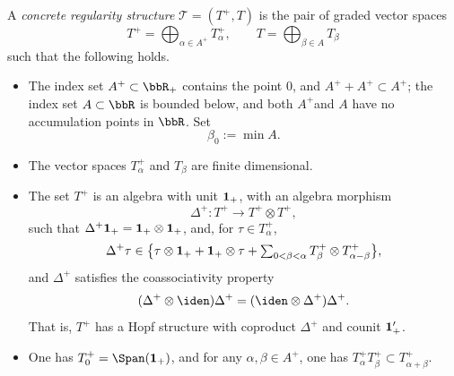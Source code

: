 \begin{defn*}
A \emph{{concrete regularity structure}} $\mathscr{T}=(T^+,T)$ is the pair of graded vector spaces\vspace*{-3pt}
\[
T^+ = \bigoplus_{\alpha\in A^+} T_\alpha^+, \qquad T = \bigoplus_{\beta\in A} T_\beta
\]
such that the following holds.
\begin{itemize}
\item The index set $A^{+}\subset \bbR_+$ contains the point $0$, and $A^++A^+ \subset A^+$; the index set $A\subset\bbR$ is bounded below, and both $A^+$and $A$ have no accumulation points in $\bbR$. Set\vspace*{-3pt}
\[
\beta_0 := \min A.
\]

\item The vector spaces $T_\alpha^+$ and $T_\beta$ are finite dimensional.

\item The set $T^+$ is an algebra with unit $\bf 1_+$, with an algebra morphism\vspace*{-3pt}
\[
\Delta^+ : T^+\to T^+\otimes T^+,
\]
such that $\Delta^+{\bf 1}_+ = {\bf 1}_+\otimes {\bf 1}_+$, and, for $\tau\in T_\alpha^+$,\vspace*{-3pt}
\begin{equation} \label{EqDefnDeltaPlus}
\Delta^+\tau \in \bigl\{\tau\otimes {\bf 1}_+ + {\bf 1}_+\otimes \tau + \textstyle\sum_{0<\beta<\alpha} T^+_\beta\otimes T^+_{\alpha-\beta}\bigr\},
\end{equation}
and $\Delta^+$ satisfies the coassociativity property\vspace*{-3pt}
\[
(\Delta^+\otimes\iden )\Delta^+ = (\iden \otimes\Delta^+)\Delta^+.
\]
That is, $T^+$ has a Hopf structure with coproduct $\Delta^+$ and counit ${\bf1}_+'$.

\item One has $T_0^+ = \Span({\bf 1}_+)$, and for any $\alpha,\beta\in A^+$, one has $T_\alpha^+ T_\beta^+ \subset T_{\alpha+\beta}^+$.


\end{itemize}
\end{defn*}
